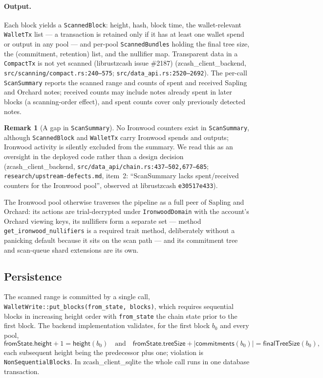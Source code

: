 \documentclass[11pt,a4paper]{article}
\theoremstyle{definition}
\newtheorem{remark}[theorem]{Remark}
\begin{document}
\paragraph{Output.} Each block yields a \texttt{ScannedBlock}: height,
hash, block time, the wallet-relevant \texttt{WalletTx} list --- a
transaction is retained only if it has at least one wallet spend or output
in any pool --- and per-pool \texttt{ScannedBundles} holding the final tree
size, the (commitment, retention) list, and the nullifier map. Transparent
data in a \texttt{CompactTx} is not yet scanned (\textsf{librustzcash}
issue \#2187)
(\textsf{zcash\_client\_backend}, \texttt{src/scanning/compact.rs:240--575};
\texttt{src/data\_api.rs:2520--2692}). The per-call \texttt{ScanSummary}
reports the scanned range and counts of spent and received Sapling and
Orchard notes; received counts may include notes already spent in later
blocks (a scanning-order effect), and spent counts cover only previously
detected notes.

\begin{remark}[A gap in \texttt{ScanSummary}]\label{rem:sync-summary-gap}
No Ironwood counters exist in \texttt{ScanSummary}, although
\texttt{ScannedBlock} and \texttt{WalletTx} carry Ironwood spends and
outputs; Ironwood activity is silently excluded from the summary. We read
this as an oversight in the deployed code rather than a design decision
(\textsf{zcash\_client\_backend},
\texttt{src/data\_api/chain.rs:437--502,677--685};
\texttt{research/upstream-defects.md}, item~2: ``ScanSummary lacks
spent/received counters for the Ironwood pool'', observed at
\textsf{librustzcash} \texttt{e30517e433}).
\end{remark}

The Ironwood pool otherwise traverses the pipeline as a full peer of
Sapling and Orchard: its actions are trial-decrypted under
\texttt{IronwoodDomain} with the account's Orchard viewing keys, its
nullifiers form a separate set --- method \texttt{get\_ironwood\_nullifiers}
is a required trait method, deliberately without a panicking default
because it sits on the scan path --- and its commitment tree and scan-queue
shard extensions are its own.

\subsection{Persistence}\label{sec:sync-persist}

The scanned range is committed by a single call,
\texttt{WalletWrite::put\_blocks(from\_state, blocks)}, which requires
sequential blocks in increasing height order with \texttt{from\_state} the
chain state prior to the first block. The backend implementation validates,
for the first block $b_0$ and every pool,
\[
\mathsf{fromState.height} + 1 = \mathsf{height}(b_0)
\quad\text{and}\quad
\mathsf{fromState.treeSize} + |\mathsf{commitments}(b_0)| =
\mathsf{finalTreeSize}(b_0),
\]
each subsequent height being the predecessor plus one; violation is
\texttt{NonSequentialBlocks}. In \textsf{zcash\_client\_sqlite} the whole
call runs in one database transaction.
\end{document}
